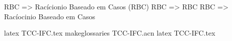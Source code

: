 
\let\su@ExpandTwoArgs\relax 
\let\IfSubStringInString\relax 
\let\su@IfSubStringInString\relax 

\usepackage[nomain,acronym,xindy,toc]{glossaries}


\makeglossaries


\printglossary[title=Lista de Siglas, type=\acronymtype]

\acrfull{RBC} => Racícionio Baseado em Casos (RBC)  
\acrshort{RBC} => RBC
\acrlong{RBC} => Racíocinio Baseado em Casos

latex TCC-IFC.tex
makeglossaries TCC-IFC.acn
latex TCC-IFC.tex


